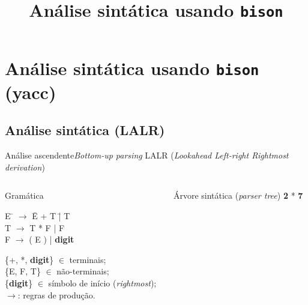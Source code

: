
\title{Análise sintática usando {\tt bison}}
\section{Análise sintática usando {\tt bison} (yacc)}

\frame{\maketitle}

\frame{\tableofcontents}

\subsection{Análise sintática (LALR)}

\begin{frame}{Análise ascendente}{{\em Bottom-up parsing}}
  LALR ({\it Lookahead Left-right Rightmost derivation\/})

  \begin{columns}
     \begin{column}{.5\textwidth}
      \begin{block}{Gramática}
        \begin{tabbing}
          E \= $\rightarrow$ \= E + T \= | T \\
          T \> $\rightarrow$ \> T * F \> | F\\
          F \> $\rightarrow$ \> ( E ) \> | {\bf digit}\\
        \end{tabbing}
        \{+, *, {\bf digit}\} $\in$ terminais;\\
        \{E, F, T\} $\in$ não-terminais;\\
        \{{\bf digit}\} $\in$ símbolo de início ({\it rightmost\/});\\
        $\rightarrow$: regras de produção.
      \end{block}
    \end{column}
    \pause
    \begin{column}{.5\textwidth}
      \begin{block}{Árvore sintática ({\it parser tree\/})}
        {\bf 2} * {\bf 7}\\ 
        \small
    \end{block}
    \end{column}
  \end{columns}
\end{frame}

